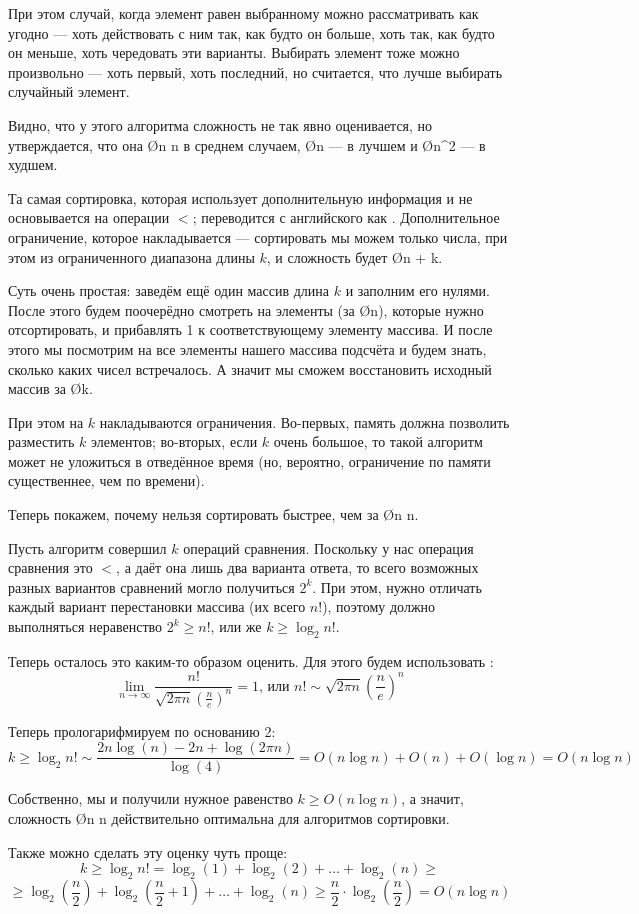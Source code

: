 При этом случай, когда элемент равен выбранному можно рассматривать как угодно — хоть действовать с ним так, как будто он больше, хоть так, как будто он меньше, хоть чередовать эти варианты. Выбирать элемент тоже можно произвольно — хоть первый, хоть последний, но считается, что лучше выбирать случайный элемент.

Видно, что у этого алгоритма сложность не так явно оценивается, но утверждается, что она \O{n \log n} в среднем случаем, \O{n} — в лучшем и \O{n^2} — в худшем.

Та самая сортировка, которая использует дополнительную информация и не основывается на операции $<$; переводится с английского как . Дополнительное ограничение, которое накладывается — сортировать мы можем только числа, при этом из ограниченного диапазона длины $k$, и сложность будет \O{n + k}.

Суть очень простая: заведём ещё один массив длина $k$ и заполним его нулями. После этого будем поочерёдно смотреть на элементы (за \O{n}), которые нужно отсортировать, и прибавлять 1 к соответствующему элементу массива. И после этого мы посмотрим на все элементы нашего массива подсчёта и будем знать, сколько каких чисел встречалось. А значит мы сможем восстановить исходный массив за \O{k}.

При этом на $k$ накладываются ограничения. Во-первых, память должна позволить разместить $k$ элементов; во-вторых, если $k$ очень большое, то такой алгоритм может не уложиться в отведённое время (но, вероятно, ограничение по памяти существеннее, чем по времени).

Теперь покажем, почему нельзя сортировать быстрее, чем за \O{n \log n}.

\begin{box-proof}
    Пусть алгоритм совершил $k$ операций сравнения. Поскольку у нас операция сравнения это $<$, а даёт она лишь два варианта ответа, то всего возможных разных вариантов сравнений могло получиться $2^k$. При этом, нужно отличать каждый вариант перестановки массива (их всего $n!$), поэтому должно выполняться неравенство $2^k \geq n!$, или же $k \geq \log_2 n!$.

    Теперь осталось это каким-то образом оценить. Для этого будем использовать :
    $$\lim\limits_{n\to \infty} \frac{n!}{\sqrt{2\pi n} \left({ \frac{n}{e} }\right)^{n} }=1 \text{, или } n! \sim {\sqrt{2\pi n}} \left({ \frac{n}{e} }\right) ^{n}$$

    Теперь прологарифмируем по основанию 2:
    $$k \geq \log_2 n! \sim \frac{2n\log(n) - 2n + \log(2 \pi n)}{\log(4)} = O(n \log n) + O(n) + O(\log n) = O(n \log n)$$

    Собственно, мы и получили нужное равенство $k \geq O(n \log n)$, а значит, сложность \O{n \log n} действительно оптимальна для алгоритмов сортировки.

    Также можно сделать эту оценку чуть проще:
    $$k \geq \log_2 n! = \log_2(1) + \log_2(2) + \ldots + \log_2(n) \geq $$
    $$ \geq \log_2\left(\frac{n}{2}\right) + \log_2\left(\frac{n}{2} + 1\right) + \ldots + \log_2(n) \geq \frac{n}{2} \cdot \log_2 \left( \frac{n}{2} \right) = O(n \log n)$$
\end{box-proof}
